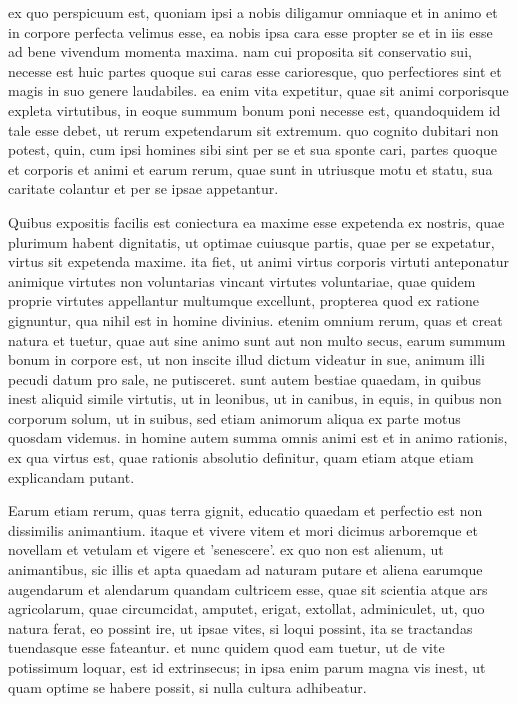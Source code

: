  ex quo perspicuum est, quoniam ipsi a nobis diligamur omniaque et in animo et in corpore perfecta velimus esse, ea nobis ipsa cara esse propter se et in iis esse ad bene vivendum momenta maxima. nam cui proposita sit conservatio sui, necesse est huic partes quoque sui caras esse carioresque, quo perfectiores sint et magis in suo genere laudabiles. ea enim vita expetitur, quae sit animi corporisque expleta virtutibus, in eoque summum bonum poni necesse est, quandoquidem id tale esse debet, ut rerum expetendarum sit extremum. quo cognito dubitari non potest, quin, cum ipsi homines sibi sint per se et sua sponte cari, partes quoque et corporis et animi et earum rerum, quae sunt in utriusque motu et statu, sua caritate colantur et per se ipsae appetantur.

 Quibus expositis facilis est coniectura ea maxime esse expetenda ex nostris, quae plurimum habent dignitatis, ut optimae cuiusque partis, quae per se expetatur, virtus sit expetenda maxime. ita fiet, ut animi virtus corporis virtuti anteponatur animique virtutes non voluntarias vincant virtutes voluntariae, quae quidem proprie virtutes appellantur multumque excellunt, propterea quod ex ratione gignuntur, qua nihil est in homine divinius. etenim omnium rerum, quas et creat natura et tuetur, quae aut sine animo sunt aut non multo secus, earum summum bonum in corpore est, ut non inscite illud dictum videatur in sue, animum illi pecudi datum pro sale, ne putisceret. sunt autem bestiae quaedam, in quibus inest aliquid simile virtutis, ut in leonibus, ut in canibus, in equis, in quibus non corporum solum, ut in suibus, sed etiam animorum aliqua ex parte motus quosdam videmus. in homine autem summa omnis animi est et in animo rationis, ex qua virtus est, quae rationis absolutio definitur, quam etiam atque etiam explicandam putant.

 Earum etiam rerum, quas terra gignit, educatio quaedam et perfectio est non dissimilis animantium. itaque et vivere vitem et mori dicimus arboremque et novellam et vetulam et vigere et 'senescere'. ex quo non est alienum, ut animantibus, sic illis et apta quaedam ad naturam putare et aliena earumque augendarum et alendarum quandam cultricem esse, quae sit scientia atque ars agricolarum, quae circumcidat, amputet, erigat, extollat, adminiculet, ut, quo natura ferat, eo possint ire, ut ipsae vites, si loqui possint, ita se tractandas tuendasque esse fateantur. et nunc quidem quod eam tuetur, ut de vite potissimum loquar, est id extrinsecus; in ipsa enim parum magna vis inest, ut quam optime se habere possit, si nulla cultura adhibeatur.

